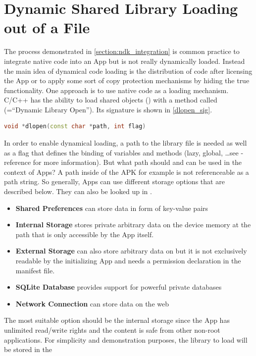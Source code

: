 \section{Dynamic Shared Library Loading out of a File}\label{section:shared_library_loading}
The process demonstrated in \autoref{section:ndk_integration} is common practice to
integrate native code into an App but is not really dynamically loaded. Instead
the main idea of dynamical code loading is the distribution of code
after licensing the App or to apply some sort of copy protection mechanisms by hiding
the true functionality. One approach is to use native code as a loading mechanism.
C/C++ has the ability to load shared objects () with a method called
 (=``Dynamic Library Open''). Its signature is shown in \autoref{dlopen_sig}.
\begin{lstlisting}[language=C++, caption=dlopen() Signature, label=dlopen_sig]
void *dlopen(const char *path, int flag)
\end{lstlisting}
In order to enable dynamical loading, a path to the library file is needed as well as a flag that defines the binding of variables and methods (lazy, global, \ldots see -reference for more information).
But what path should and can be used in the context of Apps? A path inside of the APK
for example is not referenceable as a path string. So generally, Apps can use different storage options that are described below. They can also be looked up in \parencite{storage_options}.
\begin{itemize}
\item \textbf{Shared Preferences} can store data in form of key-value pairs
\item \textbf{Internal Storage} stores private arbitrary data on the device memory at the path
  that is only accessible by the App itself.
\item \textbf{External Storage} can also store arbitrary data on  but it is not exclusively readable by the initializing App and needs a permission declaration in
the manifest file.
\item \textbf{SQLite Database} provides support for powerful private databases
\item \textbf{Network Connection} can store data on the web
\end{itemize}
The most suitable option should be the internal storage since the App has unlimited read/write rights and the content is safe from other non-root applications. For simplicity and demonstration purposes, the library to load will be stored in the
